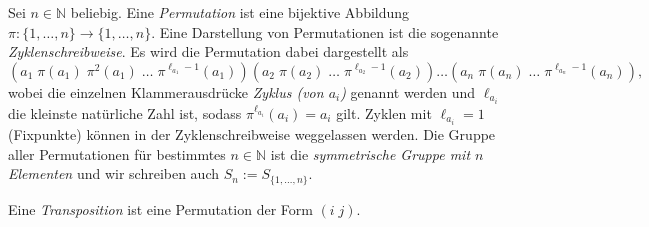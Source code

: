 \begin{definition}
    Sei $n\in\mathbb{N}$ beliebig. Eine \emph{Permutation} ist eine bijektive Abbildung $\pi: \{1, \ldots, n\} \to \{1, \ldots, n\}$. Eine Darstellung von Permutationen ist die sogenannte \emph{Zyklenschreibweise}. Es wird die Permutation dabei dargestellt als
    $$ (a_1\; \pi(a_1)\; \pi^2(a_1)\; \ldots \; \pi^{\ell_{a_1} - 1}(a_1)) (a_2\; \pi(a_2)\; \ldots \; \pi^{\ell_{a_2} - 1}(a_2)) \ldots (a_n\; \pi(a_n)\; \ldots \; \pi^{\ell_{a_n} - 1}(a_n)),$$
    wobei die einzelnen Klammerausdrücke \emph{Zyklus (von $a_i$)} genannt werden und $\ell_{a_i}$ die kleinste natürliche Zahl ist, sodass $\pi^{\ell_{a_i}}(a_i) = a_i$ gilt. Zyklen mit $\ell_{a_i} = 1$ (Fixpunkte) können in der Zyklenschreibweise weggelassen werden.
    Die Gruppe aller Permutationen für bestimmtes $n \in \mathbb{N}$ ist die \emph{symmetrische Gruppe mit $n$ Elementen} und wir schreiben auch $S_n := S_{\{1,\ldots, n\}}$.

    Eine \emph{Transposition} ist eine Permutation der Form $(i\; j)$.
\end{definition}

